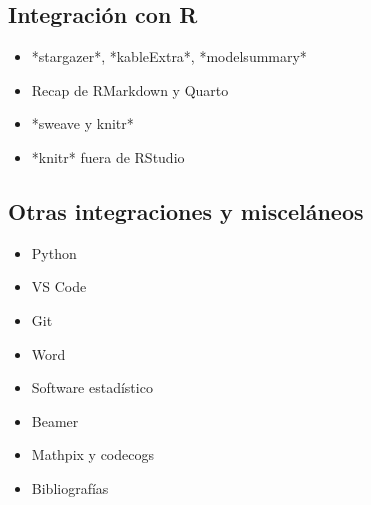 \documentclass[12pt]{article}
\begin{document}
\subsection*{Integración con R}

\begin{itemize}
    \item *stargazer*, *kableExtra*, *modelsummary*
    \item Recap de RMarkdown y Quarto
    \item *sweave y knitr*
    \item *knitr* fuera de RStudio
\end{itemize}

\subsection*{Otras integraciones y misceláneos}

\begin{itemize}
    \item Python
    \item VS Code
    \item Git
    \item Word
    \item Software estadístico
    \item Beamer
    \item Mathpix y codecogs
    \item Bibliografías
\end{itemize}
\end{document}
